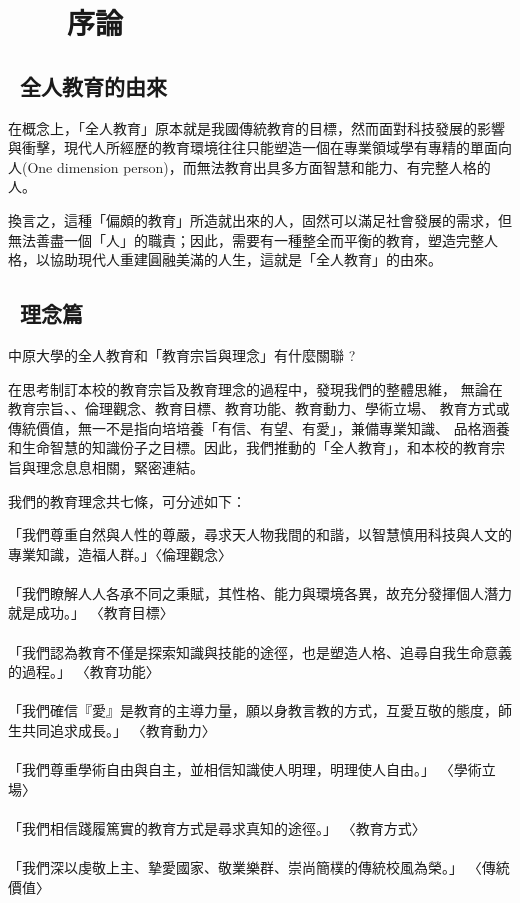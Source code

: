 
\chapter{~~~ 序論}
\label{ch:ch1}

\section{~全人教育的由來 }
\label{se:se1}
在概念上，「全人教育」原本就是我國傳統教育的目標，然而面對科技發展的影響與衝擊，現代人所經歷的教育環境往往只能塑造一個在專業領域學有專精的單面向人(One dimension person)，而無法教育出具多方面智慧和能力、有完整人格的人。\par
換言之，這種「偏頗的教育」所造就出來的人，固然可以滿足社會發展的需求，但無法善盡一個「人」的職責；因此，需要有一種整全而平衡的教育，塑造完整人格，以協助現代人重建圓融美滿的人生，這就是「全人教育」的由來。

\section{~理念篇}
\label{se:se2}
中原大學的全人教育和「教育宗旨與理念」有什麼關聯 ? 
\par
在思考制訂本校的教育宗旨及教育理念的過程中，發現我們的整體思維， 無論在教育宗旨、、倫理觀念、教育目標、教育功能、教育動力、學術立場、 教育方式或傳統價值，無一不是指向培培養「有信、有望、有愛」，兼備專業知識、 品格涵養和生命智慧的知識份子之目標。因此，我們推動的「全人教育」，和本校的教育宗旨與理念息息相關，緊密連結。
\par
我們的教育理念共七條，可分述如下：
\\
\par
「我們尊重自然與人性的尊嚴，尋求天人物我間的和諧，以智慧慎用科技與人文的專業知識，造福人群。」〈倫理觀念〉 
\\\\
「我們瞭解人人各承不同之秉賦，其性格、能力與環境各異，故充分發揮個人潛力就是成功。」 〈教育目標〉 
\\\\
「我們認為教育不僅是探索知識與技能的途徑，也是塑造人格、追尋自我生命意義的過程。」 〈教育功能〉 
\\\\
「我們確信『愛』是教育的主導力量，願以身教言教的方式，互愛互敬的態度，師生共同追求成長。」 〈教育動力〉
\\\\
「我們尊重學術自由與自主，並相信知識使人明理，明理使人自由。」 〈學術立場〉
\\\\
「我們相信踐履篤實的教育方式是尋求真知的途徑。」 〈教育方式〉
\\\\
「我們深以虔敬上主、摯愛國家、敬業樂群、崇尚簡樸的傳統校風為榮。」 〈傳統價值〉
\\\\

